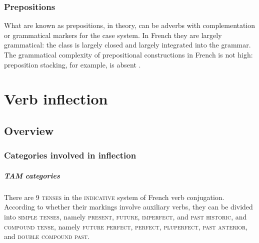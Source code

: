 \documentclass[a4paper, oneside, 12pt]{report}
\newcommand*{\category}[1]{\textsc{#1}}
\begin{document}
\subsection{Prepositions}

What are known as prepositions, in theory, can be adverbs with complementation
or grammatical markers for the case system.
In French they are largely grammatical:
the class is largely closed and largely integrated into the grammar.
The grammatical complexity of prepositional constructions in French is not high:
preposition stacking, for example, is absent .

\chapter{Verb inflection}

\section{Overview}

\subsection{Categories involved in inflection}\label{sec:verb-inflection.overview.categories}

\paragraph*{TAM categories}
There are 9 \category{tenses} in the \category{indicative} system of French verb conjugation.
According to whether their markings involve auxiliary verbs,
they can be divided into \category{simple tenses}, namely \category{present}, \category{future}, \category{imperfect}, and \category{past historic},
and \category{compound tense}, namely \category{future perfect}, \category{perfect}, \category{pluperfect}, \category{past anterior}, and \category{double compound past}.





\end{document}
